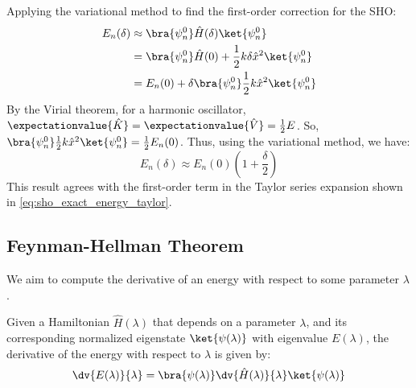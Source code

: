 \begin{example}
    Applying the variational method to find the first-order
    correction for the SHO:
    \begin{align} \label{eq:sho_variational_first_order}
        E_n(\delta) &\approx \bra {\psi_n^0}\hat H (\delta) \ket{\psi_n^0} \\
        &=\bra {\psi_n^0}\hat H (0) + \frac{1}{2}k\delta\hat
        x^2\ket{\psi_n^0} \notag \\
        &=E_n(0) + \delta \bra{\psi_n^0}\frac{1}{2}k\hat
        x^2\ket{\psi_n^0} \notag
    \end{align}
    By the Virial theorem, for a harmonic oscillator,
    $\expectationvalue{\hat K} = \expectationvalue{\hat V} =
    \frac{1}{2}E$. So, $\bra{\psi_n^0}\frac{1}{2}k\hat
    x^2\ket{\psi_n^0} = \frac{1}{2}E_n(0)$. Thus, using the
    variational method, we have:
    \begin{equation}
        E_n(\delta) \approx E_n(0)\left( 1 + \frac{\delta}{2}\right)
    \end{equation}
    This result agrees with the first-order term in the Taylor series
    expansion shown in \eqref{eq:sho_exact_energy_taylor}.
\end{example}

\hr
\subsection{Feynman-Hellman Theorem}
We aim to compute the derivative of an energy with respect to some
parameter $\lambda$.

\begin{theorem}
    Given a Hamiltonian $\hat H(\lambda)$ that depends on a parameter
    $\lambda$, and its corresponding normalized eigenstate
    $\ket{\psi(\lambda)}$ with eigenvalue $E(\lambda)$, the
    derivative of the energy with respect to $\lambda$ is given by:
    \begin{equation} \label{eq:feynman_hellman_theorem}
        \dv{E(\lambda)}{\lambda} = \bra{\psi(\lambda)} \dv{\hat
        H(\lambda)}{\lambda} \ket{\psi(\lambda)}
    \end{equation}
\end{theorem}

